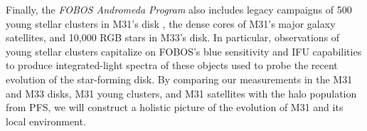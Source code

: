 \documentclass[11pt,a4paper,twoside,onecolumn,openany,final,oldfontcommands]{memoir}
\begin{document}
Finally, the {\it FOBOS Andromeda Program} also includes legacy campaigns of 500 young stellar clusters in M31's disk \citep[dwarfing even Milky Way samples,][]{johnson15}, the dense cores of M31's major galaxy satellites, and 10,000 RGB stars in M33's disk.  In particular, observations of young stellar clusters capitalize on FOBOS's blue sensitivity and IFU capabilities to produce integrated-light spectra of these objects used to probe the recent evolution of the star-forming disk.  By comparing our measurements in the M31 and M33 disks, M31 young clusters, and M31 satellites with the halo population from PFS, we will construct a holistic picture of the evolution of M31 and its local environment.






\end{document}
